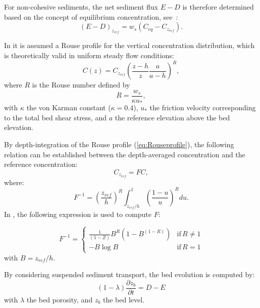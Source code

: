 For non-cohesive sediments, the net sediment flux $E-D$ is therefore determined based on the concept of equilibrium concentration, see~\cite{CelikRodi}:
\begin{equation}\label{eq:CelikRodi}
\left(E-D \right)_{z_{ref}} = w_s \left(C_{eq} - C_{z_{ref}}\right).
\end{equation}

In \sisyphe{} it is assumed a Rouse profile for the vertical concentration distribution,
which is theoretically valid in uniform steady flow conditions:
\begin{equation}\label{eq:Rouseprofile}
C(z)=C_{z_{ref}}\left(\frac{z-h}{z}\frac{a}{a-h}\right)^R, 
\end{equation}
where $R$ is the Rouse number defined by
\begin{equation}\label{eq:R}
R=\frac{w_s}{\kappa u_*}, 
\end{equation}
with $\kappa$ the von Karman constant ($\kappa = 0.4$), $u_*$ the
friction velocity corresponding to the total bed shear stress, and $a$ the reference elevation above the bed elevation.

By depth-integration of the Rouse profile (\ref{eq:Rouseprofile}), the following relation
can be established between the depth-averaged concentration and the reference concentration:
\begin{equation*}
  C_{z_{ref}} = F C,
\end{equation*}
where:
\begin{equation}\label{eq:Rouseprofile}
F^{-1} = \left(\frac{z_{ref}}{h}\right)^R\int_{z_{ref}/h}^1\left(\frac{1-u}{u}\right)^R du. 
\end{equation}
In \sisyphe{}, the following expression is used to compute $F$:

\begin{equation*}
F^{-1}=\left\{\begin{array}{ll}
\frac{1}{\left(1-Z\right)} B^R\left( 1-B^{(1-R)} \right) & \text{if}\,R \neq 1\\
-B \log B &  \text{if}\,R = 1
\end{array}
\right.
\end{equation*}
with $B = z_{ref}/h$.

By considering suspended sediment transport, the bed evolution is computed by: %
\begin{equation*}
(1-\lambda)\frac{\partial z_b}{\partial t} = D - E
\end{equation*}
with $\lambda$ the bed porosity, and $z_b$ the bed level.

